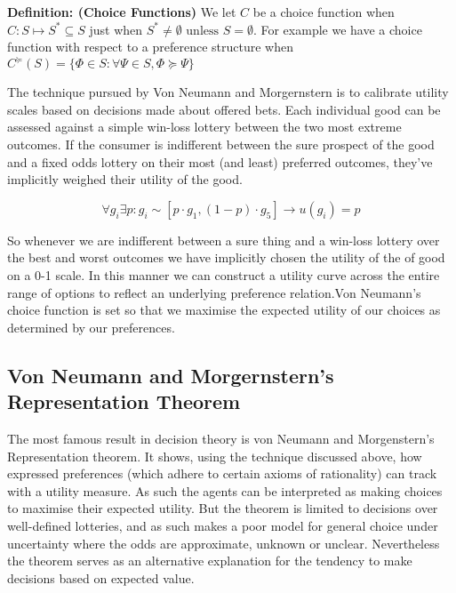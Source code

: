 \documentclass[]{tufte-book}
\theoremstyle{definition}
\theoremstyle{definition}
\theoremstyle{definition}
\theoremstyle{remark}
\begin{document}
\textbf{Definition: (Choice Functions)} We let \textbf{$C$} be a choice function when \({C: S \mapsto S^{*} \subseteq S}\) just when \({S^{*} \neq \emptyset \text{ unless } S = \emptyset }\). For example we have a choice function with respect to a preference structure when \({C^{\succeq}(S) = \{ \Phi \in S : \forall \Psi \in S, \Phi \succeq \Psi \}}\)

The technique pursued by Von Neumann and Morgernstern is to calibrate utility scales based on decisions made about offered bets. Each individual good can be assessed against a simple win-loss lottery between the two most extreme outcomes. If the consumer is indifferent between the sure prospect of the good and a fixed odds lottery on their most (and least) preferred outcomes, they've implicitly weighed their utility of the good.

\[ \forall g_i \exists  p :  g _{i} \sim [p \cdot g_{1}, (1-p)\cdot g_{5}] \rightarrow u(g_{i}) = p \]

\noindent So whenever we are indifferent between a sure thing and a win-loss lottery over the best and worst outcomes we have implicitly chosen the utility of the of good on a 0-1 scale. In this manner we can construct a utility curve across the entire range of options to reflect an underlying preference relation.Von Neumann's choice function is set so that we maximise the expected utility of our choices as determined by our preferences.

\hypertarget{von-neumann-and-morgernsterns-representation-theorem}{%
\subsection{Von Neumann and Morgernstern's Representation Theorem}\label{von-neumann-and-morgernsterns-representation-theorem}}

The most famous result in decision theory is von Neumann and Morgenstern's Representation theorem. It shows, using the technique discussed above, how expressed preferences (which adhere to certain axioms of rationality) can track with a utility measure. As such the agents can be interpreted as making choices to maximise their expected utility. But the theorem is limited to decisions over well-defined lotteries, and as such makes a poor model for general choice under uncertainty where the odds are approximate, unknown or unclear. Nevertheless the theorem serves as an alternative explanation for the tendency to make decisions based on expected value.
\end{document}
